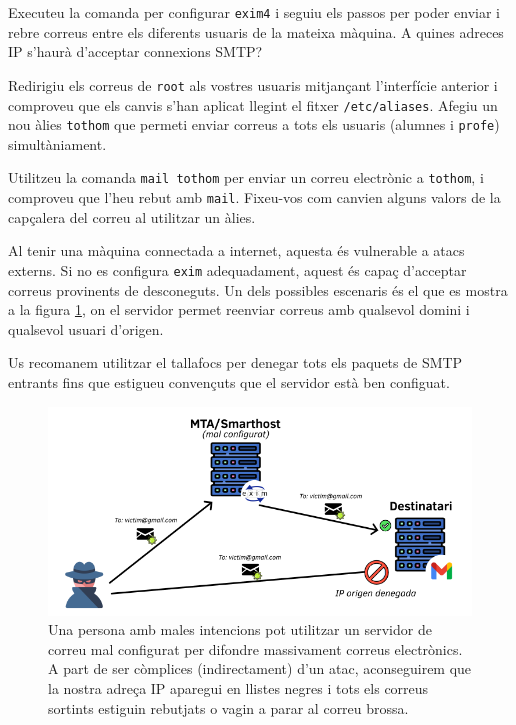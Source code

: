 \documentclass{practicaitic}
\begin{document}
\begin{tasca}
  Executeu la comanda per configurar \texttt{exim4} i seguiu els passos
  per poder enviar i rebre correus entre els diferents usuaris de la
  mateixa màquina. A quines adreces IP s'haurà d'acceptar connexions SMTP?

  Redirigiu els correus de \texttt{root} als vostres usuaris mitjançant
  l'interfície anterior i comproveu que els canvis s'han aplicat llegint el
  fitxer \texttt{/etc/aliases}. Afegiu un nou àlies \texttt{tothom} que
  permeti enviar correus a tots els usuaris (alumnes i \texttt{profe})
  simultàniament.

  Utilitzeu la comanda \texttt{mail tothom} per enviar un correu electrònic a
  \texttt{tothom}, i comproveu que l'heu rebut amb \texttt{mail}. Fixeu-vos
  com canvien alguns valors de la capçalera del correu al utilitzar un àlies.
\end{tasca}

\begin{tcolorbox}[
  title=Atenció,
  colback=red!10, colframe=red!50,
  rounded corners
]
Al tenir una màquina connectada a internet, aquesta és vulnerable a atacs
externs. Si no es configura \texttt{exim} adequadament, aquest és capaç
d'acceptar correus provinents de desconeguts. Un dels possibles escenaris
és el que es mostra a la figura \ref{fig:escenari-malicios}, on el servidor
permet reenviar correus amb qualsevol domini i qualsevol usuari d'origen.
\newline

Us recomanem utilitzar el tallafocs per denegar tots els paquets de SMTP
entrants fins que estigueu convençuts que el servidor està ben configuat.
\end{tcolorbox}

\begin{figure}[h]
  \includegraphics[width=0.6\linewidth]{assets/p4-escenari-malicios.png}
  \centering
  \caption{
    Una persona amb males intencions pot utilitzar un servidor de correu
    mal configurat per difondre massivament correus electrònics. A part de
    ser còmplices (indirectament) d'un atac, aconseguirem que la nostra adreça
    IP aparegui en llistes negres i tots els correus sortints estiguin rebutjats
    o vagin a parar al correu brossa.
    }
  \label{fig:escenari-malicios}
\end{figure}
\end{document}
